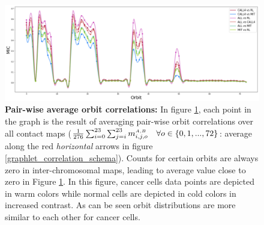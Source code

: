 \documentclass[a4,center,fleqn]{NAR}
\begin{document}
\begin{figure}
    \centering
    \includegraphics[width=\textwidth]{figures/orbits_correlations_all.png}
    \caption{
        \textbf{Pair-wise average orbit correlations:}
        In figure \ref{fig:orbits_correlations_all}, each point
        in the graph is the result of averaging pair-wise
        orbit correlations over all contact maps
        ($\frac{1}{276}\sum_{i=0}^{23}\sum_{j=i}^{23}{
        m^{\scriptscriptstyle \scriptscriptstyle A,B}_{i,j, o}} \quad 
        \forall o \in \{0, 1, ..., 72\}$:
        average along the red \textit{horizontal} arrows in figure 
        \ref{graphlet_correlation_schema}).
        Counts for certain orbits are always zero in inter-chromosomal
        maps, leading to average value close to zero in 
        Figure \ref{fig:orbits_correlations_all}.
        In this figure, cancer cells data points are depicted
        in warm colors while normal cells are depicted in
        cold colors in increased contrast. As can be seen
        orbit distributions are more similar to each other
        for cancer cells.
    }
    \label{fig:orbits_correlations_all}
\end{figure}
\end{document}
